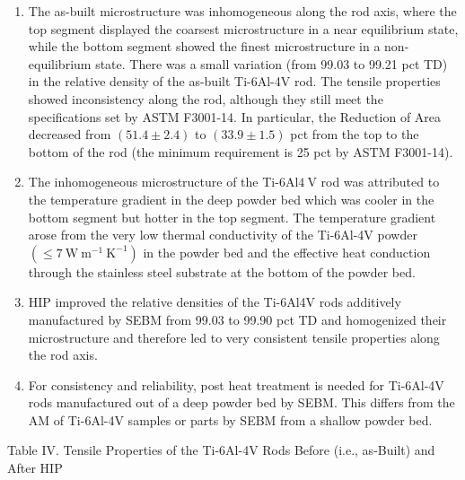 \documentclass[10pt]{article}
\begin{document}
\begin{enumerate}
  \item The as-built microstructure was inhomogeneous along the rod axis, where the top segment displayed the coarsest microstructure in a near equilibrium state, while the bottom segment showed the finest microstructure in a non-equilibrium state. There was a small variation (from 99.03 to 99.21 pct TD) in the relative density of the as-built Ti-6Al-4V rod. The tensile properties showed inconsistency along the rod, although they still meet the specifications set by ASTM F3001-14. In particular, the Reduction of Area decreased from $(51.4 \pm 2.4)$ to $(33.9 \pm 1.5)$ pct from the top to the bottom of the rod (the minimum requirement is 25 pct by ASTM F3001-14).

  \item The inhomogeneous microstructure of the Ti-6Al$4 \mathrm{~V}$ rod was attributed to the temperature gradient in the deep powder bed which was cooler in the bottom segment but hotter in the top segment. The temperature gradient arose from the very low thermal conductivity of the Ti-6Al-4V powder $\left(\leq 7 \mathrm{~W} \mathrm{~m}^{-1} \mathrm{~K}^{-1}\right)$ in the powder bed and the effective heat conduction through the stainless steel substrate at the bottom of the powder bed.

  \item HIP improved the relative densities of the Ti-6Al4V rods additively manufactured by SEBM from 99.03 to 99.90 pct TD and homogenized their microstructure and therefore led to very consistent tensile properties along the rod axis.

  \item For consistency and reliability, post heat treatment is needed for Ti-6Al-4V rods manufactured out of a deep powder bed by SEBM. This differs from the AM of Ti-6Al-4V samples or parts by SEBM from a shallow powder bed.

\end{enumerate}

Table IV. Tensile Properties of the Ti-6Al-4V Rods Before (i.e., as-Built) and After HIP
\end{document}
